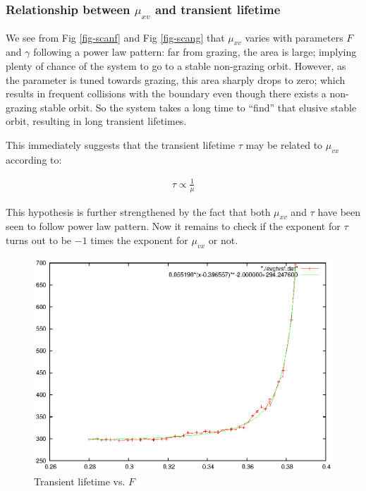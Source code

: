 \documentclass[oneside]{book}
\renewcommand{\(}{\begin{columns}}
\renewcommand{\)}{\end{columns}}
\newcommand{\<}[1]{\begin{column}{#1}}
\renewcommand{\>}{\end{column}}
\begin{document}
\subsubsection{Relationship between $\mu_{xv}$ and transient lifetime}
We see from Fig \ref{fig-scanf} and Fig \ref{fig-scang}  that $\mu_{xv}$ varies with parameters $F$ and $\gamma$ following a power law 
pattern: far from grazing, the area is large; implying plenty of chance of the 
system to go to a stable non-grazing orbit.  However, as the parameter is 
tuned towards grazing, this area sharply drops to zero; which results in 
frequent collisions with the boundary even though there exists a non-grazing 
stable orbit.  So the system takes a long time to ``find'' that elusive stable 
orbit, resulting in long transient lifetimes. 

This immediately suggests that the transient lifetime $\tau$ may be related to 
$\mu_{vx}$ according to:

\begin{align}
\label{eq-hypo-mu}
\tau\propto\frac{1}{\mu}
\end{align} 


This hypothesis is further strengthened by the fact that both $\mu_{xv}$ and 
$\tau$ have been seen to follow power law pattern.  Now it remains to check if 
the exponent for $\tau$ turns out to be $-1$ times the exponent for $\mu_{vx}$ 
or not.  

\begin{figure}
\caption{Transient lifetime vs.  $F$}
\begin{center}
\includegraphics[width=0.8\columnwidth]{trans_life_vsf_matches}
\end{center}
\end{figure}
\end{document}
